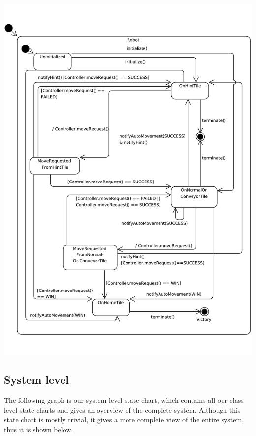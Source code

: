 	\includegraphics[width=\linewidth]{statecharts/robot.pdf}

\subsection{System level}
	The following graph is our system level state chart, which contains all our class level state charts and gives an overview of the complete system. Although this state chart is mostly trivial, it gives a more complete view of the entire system, thus it is shown below.\\

